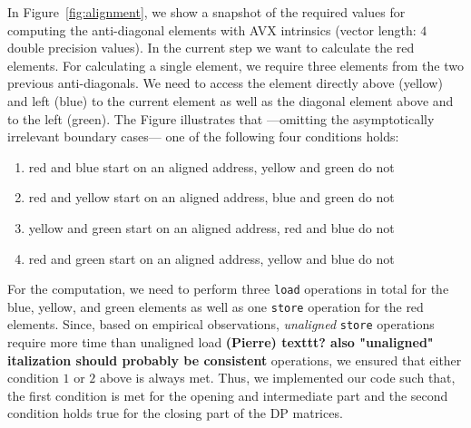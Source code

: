 \documentclass[runningheads,a4paper]{llncs}
\begin{document}
In Figure~\ref{fig:alignment}, we show a snapshot of the required values for computing the anti-diagonal elements with AVX intrinsics (vector length: $4$ double precision values).
In the current step we want to calculate the red elements.
For calculating a single element, we require three elements from the two previous anti-diagonals.
We need to access the element directly above (yellow) and left (blue) to the current element as well as the diagonal element above and to the left  (green).
The Figure illustrates that ---omitting the asymptotically irrelevant boundary cases--- one of the following four conditions holds:
\begin{enumerate}
  \item red and blue start on an aligned address, yellow and green do not
  \item red and yellow start on an aligned address, blue and green do not
  \item yellow and green start on an aligned address, red and blue do not
  \item red and green start on an aligned address, yellow and blue do not
\end{enumerate}

For the computation, we need to perform three \texttt{load} operations in total for the blue, yellow, and green elements as well as one \texttt{store} operation for the red elements.
Since, based on empirical observations, {\em unaligned} \texttt{store} operations require more time than unaligned load \textbf{(Pierre) texttt? also "unaligned" italization should probably be consistent} operations,
we ensured that either condition $1$ or $2$ above is always met.
Thus, we implemented our code such that, the first condition is met for the opening and intermediate part and the second condition holds true for the closing part of the DP matrices.


\end{document}

